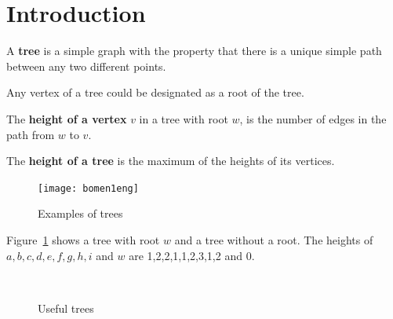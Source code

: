 \section{Introduction}

 \begin{definition}[Tree]
  \textup{ A \textbf{tree} is a simple graph with the property that
there is a unique simple path between any two different points. }
\end{definition}

Any vertex of a tree could be designated as a root of the tree.

 \begin{definition}
  \textup{
The
 \textbf{height of a vertex} $v$ in a tree with root
    $w$, is the number of edges in the path from $w$ to $v$. }
\end{definition}

 \begin{definition}
  \textup{
The
\textbf{height of a tree} is the maximum of the heights of its vertices.}
\end{definition}

\begin{figure}[ht]
\begin{center}
\texttt{[image: bomen1eng]}
\end{center}
\caption{Examples of trees \label{bomen1}}
\end{figure}


Figure~\ref{bomen1} shows a tree with root $w$ and a tree without a
root. The heights of $a,b,c,d,e,f,g,h,i$ and $w$ are 1,2,2,1,1,2,3,1,2
and 0.

\begin{figure}[ht]
\centering
\mbox{
{}}
\caption{Useful trees}
\end{figure}


